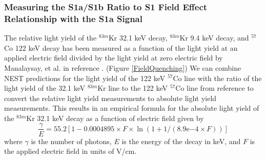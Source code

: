 \begin{figure} [!h]
\centering
{}
\qquad
{}
\label{ShittyKr}
\end{figure}

\subsubsection{Measuring the S1a/S1b Ratio to S1 Field Effect Relationship with the S1a Signal} \label{MatthewsIdea}

The relative light yield of the $^{83m}$Kr 32.1 keV decay, $^{83m}$Kr 9.4 keV decay, and $^{57}$Co 122 keV decay has been measured as a function of the light yield at an applied electric field divided by the light yield at zero electric field by Manalaysay, et al. in reference \cite{Manalaysay}. (Figure \ref{FieldQuenching})  We can combine NEST predictions for the light yield of the 122 keV $^{57}$Co line with the ratio of the light yield of the 32.1 keV $^{83m}$Kr line to the 122 keV $^{57}$Co line from reference \cite{Manalaysay} to convert the relative light yield measurements to absolute light yield measurements.  This results in an empirical formula for the absolute light yield of the $^{83m}$Kr 32.1 keV decay as a function of electric field given by
\begin{equation}
\frac{\gamma}{E} = 55.2[1-0.0004895 \times F \times \ln{(1 + 1/(8.9\mathrm{e}{-4} \times F))}]
\label{S1aYield}
\end{equation}
where $\gamma$ is the number of photons, $E$ is the energy of the decay in keV, and $F$ is the applied electric field in units of V/cm.  

